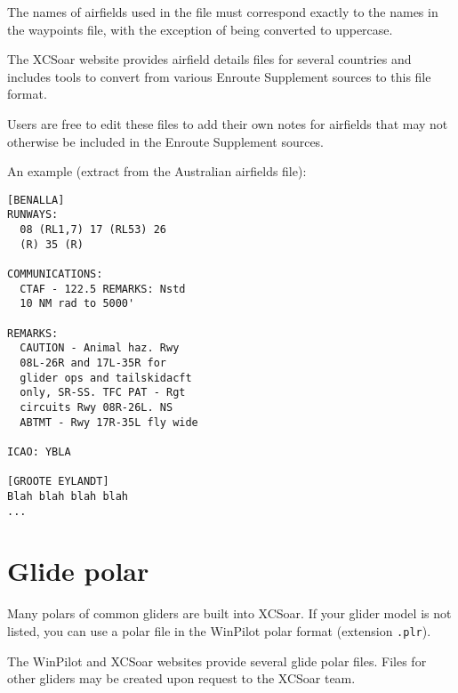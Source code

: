 The names of airfields used in the file must correspond exactly to the
names in the waypoints file, with the exception of being converted to
uppercase.

The XCSoar website provides airfield details files for several
countries and includes tools to convert from various Enroute
Supplement sources to this file format.

Users are free to edit these files to add their own notes for
airfields that may not otherwise be included in the Enroute Supplement
sources.

An example (extract from the Australian airfields file):
\begin{verbatim}
[BENALLA]
RUNWAYS:
  08 (RL1,7) 17 (RL53) 26
  (R) 35 (R)

COMMUNICATIONS:
  CTAF - 122.5 REMARKS: Nstd
  10 NM rad to 5000'

REMARKS:
  CAUTION - Animal haz. Rwy
  08L-26R and 17L-35R for
  glider ops and tailskidacft
  only, SR-SS. TFC PAT - Rgt
  circuits Rwy 08R-26L. NS
  ABTMT - Rwy 17R-35L fly wide

ICAO: YBLA

[GROOTE EYLANDT]
Blah blah blah blah
...
\end{verbatim}

\section{Glide polar} \label{sec:glide-polar}

Many polars of common gliders are built into XCSoar.  If your glider
model is not listed, you can use a polar file in the WinPilot polar
format (extension \verb|.plr|).

The WinPilot and XCSoar websites provide several glide polar files.
Files for other gliders may be created upon request to the XCSoar
team.

